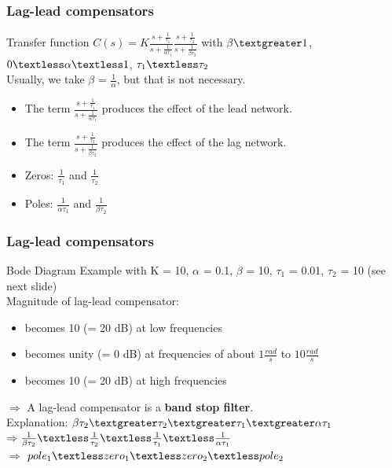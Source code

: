 \begin{frame}
\frametitle{Lag-lead compensators}
\begin{block}{Transfer function}
	$C(s) = K\frac{s + \frac{1}{\tau_1}}{s + \frac{1}{\alpha\tau_1}}\frac{s + \frac{1}{\tau_2}}{s + \frac{1}{\beta\tau_2}}$ with $\beta \textgreater 1$, $0 \textless \alpha \textless 1$, $\tau_1 \textless \tau_2$ \\
	Usually, we take $\beta$ = $\frac{1}{\alpha}$, but that is not necessary. \\
	\begin{itemize}
	\item The term $\frac{s + \frac{1}{\tau_1}}{s + \frac{1}{\alpha\tau_1}}$ produces the effect of the lead network.
	\item The term $\frac{s + \frac{1}{\tau_2}}{s + \frac{1}{\beta\tau_2}}$ produces the effect of the lag network.
	\item Zeros: $\frac{1}{\tau_1}$ and $\frac{1}{\tau_2}$
	\item Poles: $\frac{1}{\alpha \tau_1}$ and $\frac{1}{\beta \tau_2}$
	\end{itemize}
\end{block}

\end{frame}

\begin{frame}
\frametitle{Lag-lead compensators}
\begin{block}{Bode Diagram}
Example with K = 10, $\alpha$ = 0.1, $\beta$ = 10, $\tau_1$ = 0.01, $\tau_2$ = 10 (see next slide) \\
Magnitude of lag-lead compensator:
\begin{itemize}
\item becomes 10 (= 20 dB) at low frequencies
\item becomes unity (= 0 dB) at frequencies of about $1 \frac{rad}{s}$ to $10 \frac{rad}{s}$
\item becomes 10 (= 20 dB) at high frequencies
\end{itemize}
$\Rightarrow$ A lag-lead compensator is a {\bf band stop filter}. \\
Explanation: $\beta \tau_2 \textgreater \tau_2 \textgreater \tau_1 \textgreater \alpha \tau_1$ \\
$\Rightarrow \frac{1}{\beta \tau_2} \textless \frac{1}{\tau_2} \textless \frac{1}{\tau_1} \textless \frac{1}{\alpha \tau_1}$ \\
$\Rightarrow$ $pole_1 \textless zero_1 \textless zero_2 \textless pole_2$
\end{block}
\end{frame}

